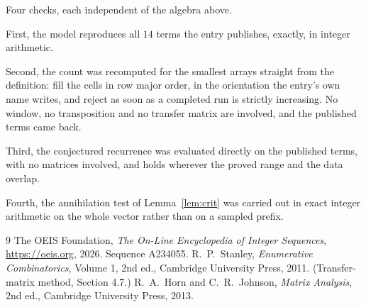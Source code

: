 \documentclass[11pt,a4paper]{article}
\theoremstyle{plain}
\theoremstyle{definition}
\begin{document}
Four checks, each independent of the algebra above.

First, the model reproduces all $14$ terms the entry publishes, exactly, in integer
arithmetic.

Second, the count was recomputed for the smallest arrays straight from the definition: fill the
cells in row major order, in the orientation the entry's own name writes, and reject as soon as
a completed run is strictly increasing. No window, no transposition and no transfer matrix are involved, and
the published terms came back.

Third, the conjectured recurrence was evaluated directly on the published terms, with no
matrices involved, and holds wherever the proved range and the data overlap.

Fourth, the annihilation test of Lemma~\ref{lem:crit} was carried out in exact integer
arithmetic on the whole vector rather than on a sampled prefix.

\begin{thebibliography}{9}
 The OEIS Foundation, \emph{The On-Line Encyclopedia of Integer
Sequences}, \url{https://oeis.org}, 2026. Sequence A234055.
 R.~P.~Stanley, \emph{Enumerative Combinatorics}, Volume 1, 2nd ed.,
Cambridge University Press, 2011. (Transfer-matrix method, Section 4.7.)
 R.~A.~Horn and C.~R.~Johnson, \emph{Matrix Analysis}, 2nd ed., Cambridge
University Press, 2013.
\end{thebibliography}
\end{document}
